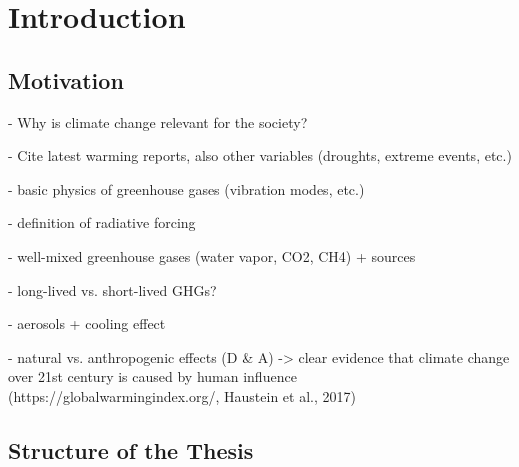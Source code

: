 


\chapter{Introduction}
\label{ch:01:introduction}


\section{Motivation}
\label{ch:01:motivation}

- Why is climate change relevant for the society?

- Cite latest warming reports, also other variables (droughts, extreme events,
etc.)

- basic physics of greenhouse gases (vibration modes, etc.)

- definition of radiative forcing

- well-mixed greenhouse gases (water vapor, CO2, CH4) + sources

- long-lived vs. short-lived GHGs?

- aerosols + cooling effect

- natural vs. anthropogenic effects (D \& A) -> clear evidence that climate
change over 21st century is caused by human influence
(https://globalwarmingindex.org/, Haustein et al., 2017)


\section{Structure of the Thesis}
\label{sec:01:structure}

